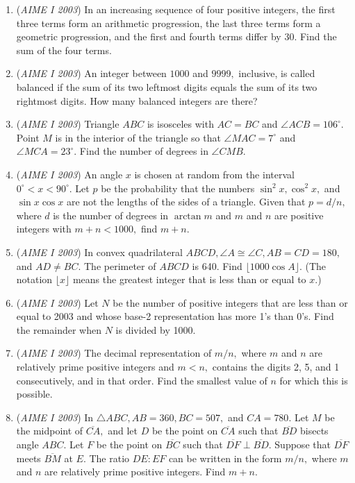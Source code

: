 \begin{enumerate}
	\item (\textit{AIME I 2003}) In an increasing sequence of four positive integers, the first three terms form an arithmetic progression, the last three terms form a geometric progression, and the first and fourth terms differ by $30.$ Find the sum of the four terms.


 

	\item (\textit{AIME I 2003}) An integer between $1000$ and $9999,$ inclusive, is called balanced if the sum of its two leftmost digits equals the sum of its two rightmost digits. How many balanced integers are there?


 

	\item (\textit{AIME I 2003}) Triangle $ABC$ is isosceles with $AC = BC$ and $\angle ACB = 106^\circ.$ Point $M$ is in the interior of the triangle so that $\angle MAC = 7^\circ$ and $\angle MCA = 23^\circ.$ Find the number of degrees in $\angle CMB.$


	\item (\textit{AIME I 2003}) An angle $x$ is chosen at random from the interval $0^\circ < x < 90^\circ.$ Let $p$ be the probability that the numbers $\sin^2 x, \cos^2 x,$ and $\sin x \cos x$ are not the lengths of the sides of a triangle. Given that $p = d/n,$ where $d$ is the number of degrees in $\arctan m$ and $m$ and $n$ are positive integers with $m + n < 1000,$ find $m + n.$


	\item (\textit{AIME I 2003}) In convex quadrilateral $ABCD, \angle A \cong \angle C, AB = CD = 180,$ and $AD \neq BC.$ The perimeter of $ABCD$ is 640. Find $\lfloor 1000 \cos A \rfloor.$ (The notation $\lfloor x \rfloor$ means the greatest integer that is less than or equal to $x.$)


 

	\item (\textit{AIME I 2003}) Let $N$ be the number of positive integers that are less than or equal to 2003 and whose base-2 representation has more 1's than 0's. Find the remainder when $N$ is divided by 1000.


 

	\item (\textit{AIME I 2003}) The decimal representation of $m/n,$ where $m$ and $n$ are relatively prime positive integers and $m < n,$ contains the digits 2, 5, and 1 consecutively, and in that order. Find the smallest value of $n$ for which this is possible.


 

	\item (\textit{AIME I 2003}) In $\triangle ABC, AB = 360, BC = 507,$ and $CA = 780.$ Let $M$ be the midpoint of $\overline{CA},$ and let $D$ be the point on $\overline{CA}$ such that $\overline{BD}$ bisects angle $ABC.$ Let $F$ be the point on $\overline{BC}$ such that $\overline{DF} \perp \overline{BD}.$ Suppose that $\overline{DF}$ meets $\overline{BM}$ at $E.$ The ratio $DE: EF$ can be written in the form $m/n,$ where $m$ and $n$ are relatively prime positive integers. Find $m + n.$


\end{enumerate}